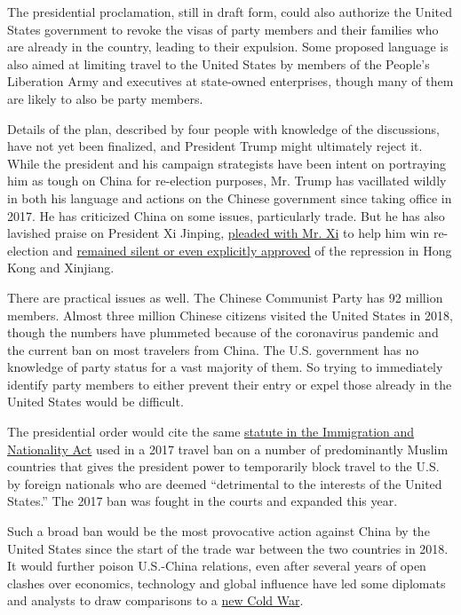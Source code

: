 The presidential proclamation, still in draft form, could also authorize
the United States government to revoke the visas of party members and
their families who are already in the country, leading to their
expulsion. Some proposed language is also aimed at limiting travel to
the United States by members of the People's Liberation Army and
executives at state-owned enterprises, though many of them are likely to
also be party members.

Details of the plan, described by four people with knowledge of the
discussions, have not yet been finalized, and President Trump might
ultimately reject it. While the president and his campaign strategists
have been intent on portraying him as tough on China for re-election
purposes, Mr. Trump has vacillated wildly in both his language and
actions on the Chinese government since taking office in 2017. He has
criticized China on some issues, particularly trade. But he has also
lavished praise on President Xi Jinping,
\href{https://www.nytimes.com/2020/06/18/us/politics/trump-china-bolton.html}{pleaded
with Mr. Xi} to help him win re-election and
\href{https://www.nytimes.com/2020/06/18/us/politics/trump-china-bolton.html}{remained
silent or even explicitly approved} of the repression in Hong Kong and
Xinjiang.

There are practical issues as well. The Chinese Communist Party has 92
million members. Almost three million Chinese citizens visited the
United States in 2018, though the numbers have plummeted because of the
coronavirus pandemic and the current ban on most travelers from China.
The U.S. government has no knowledge of party status for a vast majority
of them. So trying to immediately identify party members to either
prevent their entry or expel those already in the United States would be
difficult.

The presidential order would cite the same
\href{https://crsreports.congress.gov/product/pdf/LSB/LSB10458}{statute
in the Immigration and Nationality Act} used in a 2017 travel ban on a
number of predominantly Muslim countries that gives the president power
to temporarily block travel to the U.S. by foreign nationals who are
deemed ``detrimental to the interests of the United States.'' The 2017
ban was fought in the courts and expanded this year.

Such a broad ban would be the most provocative action against China by
the United States since the start of the trade war between the two
countries in 2018. It would further poison U.S.-China relations, even
after several years of open clashes over economics, technology and
global influence have led some diplomats and analysts to draw
comparisons to a
\href{https://www.nytimes.com/2020/07/14/world/asia/cold-war-china-us.html}{new
Cold War}.

